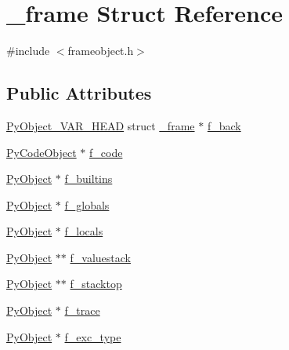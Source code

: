\hypertarget{struct__frame}{}\section{\+\_\+frame Struct Reference}
\label{struct__frame}


{\ttfamily \#include $<$frameobject.\+h$>$}

\subsection*{Public Attributes}
\begin{DoxyCompactItemize}
\item 
\mbox{\hyperlink{_python27_2object_8h_aa0eba161a76be8710b3de325c2e7f9e2}{Py\+Object\+\_\+\+V\+A\+R\+\_\+\+H\+E\+AD}} struct \mbox{\hyperlink{struct__frame}{\+\_\+frame}} $\ast$ \mbox{\hyperlink{struct__frame_a92f0794bfa51e632b26c92e197051051}{f\+\_\+back}}
\item 
\mbox{\hyperlink{struct_py_code_object}{Py\+Code\+Object}} $\ast$ \mbox{\hyperlink{struct__frame_a6c43e49e9a1dda4b0da3b584e94213f0}{f\+\_\+code}}
\item 
\mbox{\hyperlink{_python27_2object_8h_aadc84ac7aed2cfa6f20c25f62bf3dac7}{Py\+Object}} $\ast$ \mbox{\hyperlink{struct__frame_aef7749f09670f4ef49043aa80261a96f}{f\+\_\+builtins}}
\item 
\mbox{\hyperlink{_python27_2object_8h_aadc84ac7aed2cfa6f20c25f62bf3dac7}{Py\+Object}} $\ast$ \mbox{\hyperlink{struct__frame_a7a3f5887fbfe5790091cd54e032d54db}{f\+\_\+globals}}
\item 
\mbox{\hyperlink{_python27_2object_8h_aadc84ac7aed2cfa6f20c25f62bf3dac7}{Py\+Object}} $\ast$ \mbox{\hyperlink{struct__frame_a723e1f7f21d8fd1bbf93dcad47e62f74}{f\+\_\+locals}}
\item 
\mbox{\hyperlink{_python27_2object_8h_aadc84ac7aed2cfa6f20c25f62bf3dac7}{Py\+Object}} $\ast$$\ast$ \mbox{\hyperlink{struct__frame_aa313524b8ea2f4cbfd9768f44557f8a1}{f\+\_\+valuestack}}
\item 
\mbox{\hyperlink{_python27_2object_8h_aadc84ac7aed2cfa6f20c25f62bf3dac7}{Py\+Object}} $\ast$$\ast$ \mbox{\hyperlink{struct__frame_a57757e28548379cb1a3e6e82062a9fe5}{f\+\_\+stacktop}}
\item 
\mbox{\hyperlink{_python27_2object_8h_aadc84ac7aed2cfa6f20c25f62bf3dac7}{Py\+Object}} $\ast$ \mbox{\hyperlink{struct__frame_a6daba36513c0e5e5c36ac9985f70c1a3}{f\+\_\+trace}}
\item 
\mbox{\hyperlink{_python27_2object_8h_aadc84ac7aed2cfa6f20c25f62bf3dac7}{Py\+Object}} $\ast$ \mbox{\hyperlink{struct__frame_adcf0f9edaf610db9885445be200d214a}{f\+\_\+exc\+\_\+type}}

\end{DoxyCompactItemize}
